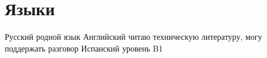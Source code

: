 \documentclass[11pt,a4paper,sans]{moderncv}
\newcommand{\lang}[2]{#1}
\begin{document}
\section
  {\lang
    {Языки}
    {Language Skills}}
\cvlanguage
  {\lang
    {Русский}
    {Russian}}
  {\lang
    {родной язык}
    {Native speaker}}
  {}
\cvlanguage
  {\lang
    {Английский}
    {English}}
  {\lang
    {читаю техническую литературу, могу поддержать разговор}
    {Good reading and translating ability}}
  {}
\cvlanguage
  {\lang
    {Испанский}
    {Spanish}}
  {\lang
    {уровень B1}
    {Nivel B1}}
  {}
\end{document}
